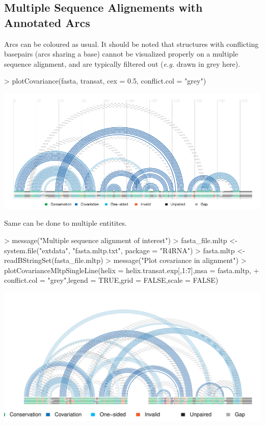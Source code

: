 \documentclass[letterpaper]{article}
\begin{document}
\subsection{Multiple Sequence Alignements with Annotated Arcs}

Arcs can be coloured as usual.  It should be noted that structures with
conflicting basepairs (arcs sharing a base) cannot be visualized properly
on a multiple sequence alignment, and are typically filtered out (\textit{e.g.}
drawn in grey here).

\begin{Schunk}
\begin{Sinput}
> plotCovariance(fasta, transat, cex = 0.5, conflict.col = "grey")
\end{Sinput}
\end{Schunk}
\includegraphics{R4RNA-022}

Same can be done to multiple entitites.

\begin{Schunk}
\begin{Sinput}
> message("Multiple sequence alignment of interest")
> fasta_file.mltp <- system.file("extdata", "fasta.mltp.txt", package = "R4RNA")
> fasta.mltp <- readBStringSet(fasta_file.mltp)
> message("Plot covariance in alignment")
> plotCovarianceMltpSingleLine(helix = helix.transat.exp[,1:7],msa = fasta.mltp,
+                              conflict.col = "grey",legend = TRUE,grid = FALSE,scale = FALSE)
\end{Sinput}
\end{Schunk}
\includegraphics{R4RNA-023}
\end{document}
